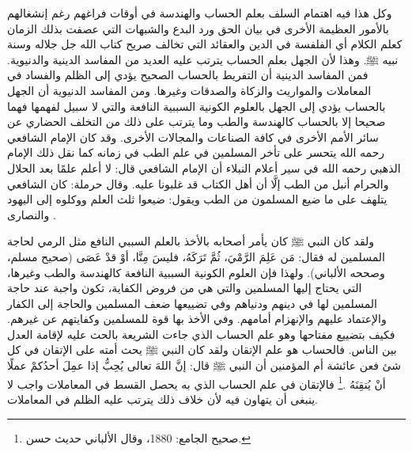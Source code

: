 وكل هذا فيه اهتمام السلف بعلم الحساب والهندسة في أوقات فراغهم رغم إنشغالهم بالأمور العظيمة الأخرى في بيان الحق ورد البدع والشبهات التي عصفت بذلك الزمان كعلم الكلام أي الفلفسة في الدين والعقائد التي تخالف صريح كتاب الله جل جلاله وسنة نبيه ﷺ. وهذا لأن الجهل بعلم الحساب يترتب عليه العديد من المفاسد الدينية والدنيوية. فمن المفاسد الدينية أن التفريط بالحساب الصحيح يؤدي إلى الظلم والفساد في المعاملات والمواريث والزكاة والصدقات وغيرها. ومن المفاسد الدنيوية أن الجهل بالحساب يؤدي إلى الجهل بالعلوم الكونية السببية النافعة والتي لا سبيل لفهمها فهما صحيحا إلا بالحساب كالهندسة والطب وما يترتب على ذلك من التخلف الحضاري عن سائر الأمم الأخرى في كافة الصناعات والمجالات الأخرى. وقد كان الإمام الشافعي رحمه الله يتحسر على تأخر المسلمين في علم الطب في زمانه كما نقل ذلك الإمام الذهبي رحمه الله في سير أعلام النبلاء أن الإمام الشافعي قال: لا أعلم علمًا بعد الحلال والحرام أنبل من الطب إلَّا أن أهل الكتاب قد غلبونا عليه. وقال حرملة: كان الشافعي يتلهف على ما ضيع المسلمون من الطب ويقول: ضيعوا ثلث العلم ووكلوه إلى اليهود والنصارى \href{https://shamela.ws/book/22669/4486#p7}{\faExternalLink} \cite{dahabi_Siyar}. 

ولقد كان النبي ﷺ كان يأمر أصحابه بالأخذ بالعلم السببي النافع مثل الرمي لحاجة المسلمين له فقال: مَن عَلِمَ الرَّمْيَ، ثُمَّ تَرَكَهُ، فليسَ مِنَّا، أوْ قدْ عَصَى {\footnotesize (صحيح مسلم، وصححه الألباني)}. ولهذا فإن العلوم الكونية السببية النافعة كالهندسة والطب وغيرها، التي يحتاج إليها المسلمين والتي هي من فروض الكفاية، تكون واجبة عند حاجة المسلمين لها في دينهم ودنياهم وفي تضييعها ضعف المسلمين والحاجة إلى الكفار والإعتماد عليهم والإنهزام أمامهم. وفي الأخذ بها قوة للمسلمين وكفايتهم عن غيرهم. فكيف بتضييع مفتاحها وهو علم الحساب الذي جاءت الشريعة بالحث عليه لإقامة العدل بين الناس. فالحساب هو علم الإتقان ولقد كان النبي ﷺ يحث أمته على الإتقان في كل شئ فعن عائشة أم المؤمنين أن النبي ﷺ قال: إنَّ اللهَ تعالى يُحِبُّ إذا عمِلَ أحدُكمْ عملًا أنْ يُتقِنَهُ \href{https://shamela.ws/book/21659/2761#p1}{\faExternalLink} \cite{jamaaSagheer}.\footnote{صحيح الجامع: 1880، وقال الألباني حديث حسن.} فالإتقان في علم الحساب الذي به يحصل القسط في المعاملات واجب لا ينبغى أن يتهاون فيه لأن خلاف ذلك يترتب عليه الظلم في المعاملات.

